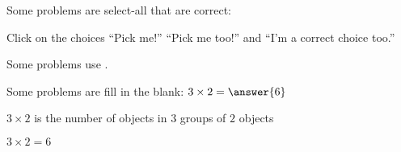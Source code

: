 \documentclass[nooutcomes]{ximera}
\begin{document}
\begin{example}
  Some problems are select-all that are correct:
  \begin{selectAll}
  \end{selectAll}
  \begin{feedback}
    Click on the choices ``Pick me!'' ``Pick me too!'' and ``I'm a correct choice too.''
  \end{feedback}
\end{example}

\begin{example}
  Some problems use .
\end{example}

\begin{example}
Some problems are fill in the blank: 
  $3\times 2 = \answer{6}$   
  \begin{hint}
    $3 \times 2$ is the number of objects in $3$ groups of $2$ objects
  \end{hint}
  \begin{hint}
    \begin{image}
    \end{image}
  \end{hint}
  \begin{hint}
    $3\times 2=6$
  \end{hint}
\end{example}
\end{document}
